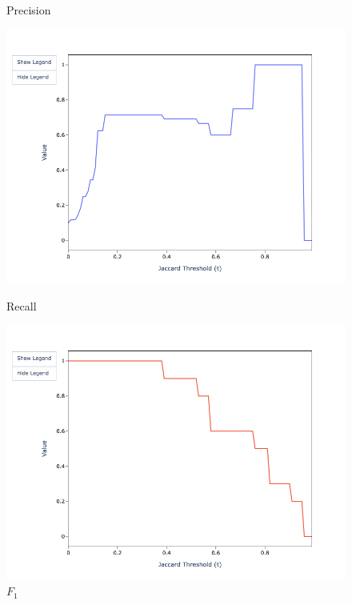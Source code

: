 \documentclass{article}
\begin{document}
    \begin{figure}[htbp]
        \begin{minipage}{0.32\textwidth}
            \centering
            \caption*{Precision}
            \includegraphics[width=\textwidth]{sample-usage/mini-fs-precision}
        \end{minipage}    
        \begin{minipage}{0.32\textwidth}
            \centering
            \caption*{Recall}
            \includegraphics[width=\textwidth]{sample-usage/mini-fs-recall}
        \end{minipage}    
        \begin{minipage}{0.32\textwidth}
            \centering
            \caption*{$F_1$}

\end{minipage}
\end{figure}
\end{document}
